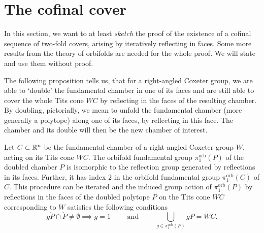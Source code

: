 

\section{The cofinal cover}

In this section, we want to at least \emph{sketch} the proof of the existence of a cofinal sequence of two-fold covers, arising by iteratively reflecting in faces.
Some more results from the theory of orbifolds are needed for the whole proof.
We will state and use them without proof.

The following proposition tells us, that for a right-angled Coxeter group, we are able to `double' the fundamental chamber in one of its faces and are still able to cover the whole Tits cone \(WC\) by reflecting in the faces of the resulting chamber.
By doubling, pictorially, we mean to unfold the fundamental chamber (more generally a polytope) along one of its faces, by reflecting in this face.
The chamber and its double will then be the new chamber of interest.

\begin{proposition}\label{prop:double}
    Let \(C \subset \mathbb{R}^n\) be the fundamental chamber of a right-angled Coxeter group \(W\), acting on its Tits cone \(WC\).
    The orbifold fundamental group \(\pi_1^{\text{orb}}(P)\) of the doubled chamber \(P\) is isomorphic to the reflection group generated by reflections in its faces.
    Further, it has index \(2\) in the orbifold fundamental group \(\pi_1^{\text{orb}}(C)\) of \(C\). %
    This procedure can be iterated and the induced group action of \(\pi_1^{\text{orb}}(P)\) by reflections in the faces of the doubled polytope \(P\) on the Tits cone \(WC\) corresponding to \(W\) satisfies the following conditions
    \[g\mathring{P} \cap \mathring{P} \neq \emptyset \implies g = 1 \qquad \text{ and } \qquad \underset{g \in \pi_1^{\text{orb}}(P)}{\bigcup} gP = WC.\]
\end{proposition}

